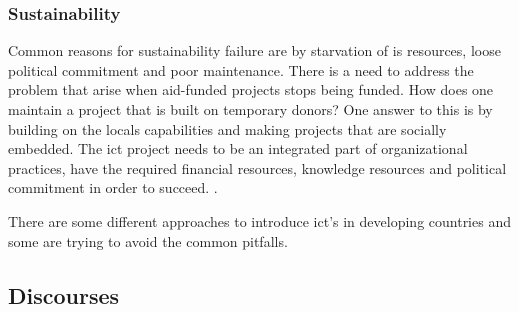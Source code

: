 \subsubsection{Sustainability}
Common reasons for sustainability failure are by starvation of \gls{is} resources, loose political commitment and poor maintenance. 
There is a need to address the problem that arise when aid-funded projects stops being funded.
How does one maintain a project that is built on temporary donors?
One answer to this is by building on the locals capabilities and making projects that are socially embedded. The \gls{ict} project needs to be an integrated part of organizational practices, have   the required financial resources, knowledge resources and political commitment in order to succeed.
\cite{jbemss:noa}.  

There are some different approaches to introduce \gls{ict}'s in developing countries and some are trying to avoid the common pitfalls.

\subsection{Discourses}
\label{subsec:discourses}


